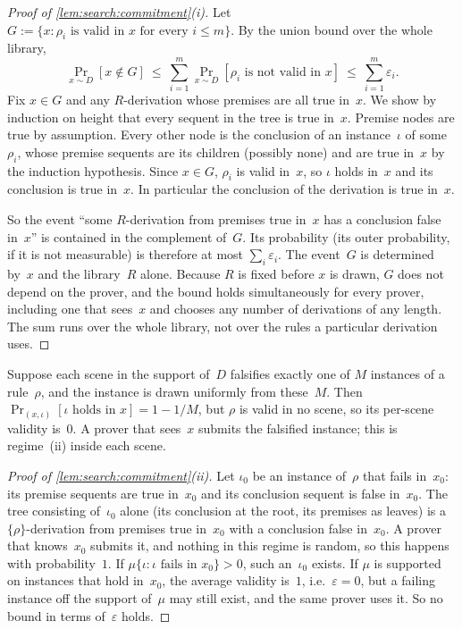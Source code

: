 \begin{proof}[Proof of \cref{lem:search:commitment}(i)]
Let $G:=\{x:\rho_i\text{ is valid in }x\text{ for every }i\le m\}$. By the union bound over the whole library,
\[
\Pr_{x\sim D}[x\notin G]\ \le\ \sum_{i=1}^m\Pr_{x\sim D}[\rho_i\text{ is not valid in }x]\ \le\ \sum_{i=1}^m\varepsilon_i .
\]
Fix $x\in G$ and any $R$-derivation whose premises are all true in~$x$. We show by induction on height that every sequent in the tree is true in~$x$. Premise nodes are true by assumption. Every other node is the conclusion of an instance~$\iota$ of some~$\rho_i$, whose premise sequents are its children (possibly none) and are true in~$x$ by the induction hypothesis. Since $x\in G$, $\rho_i$ is valid in~$x$, so $\iota$ holds in~$x$ and its conclusion is true in~$x$. In particular the conclusion of the derivation is true in~$x$.

So the event ``some $R$-derivation from premises true in~$x$ has a conclusion false in~$x$'' is contained in the complement of~$G$. Its probability (its outer probability, if it is not measurable) is therefore at most $\sum_i\varepsilon_i$. The event~$G$ is determined by~$x$ and the library~$R$ alone. Because $R$ is fixed before $x$ is drawn, $G$ does not depend on the prover, and the bound holds simultaneously for every prover, including one that sees~$x$ and chooses any number of derivations of any length. The sum runs over the whole library, not over the rules a particular derivation uses.
\end{proof}

\begin{remark}\label{rem:app:search:perpair}
Suppose each scene in the support of~$D$ falsifies exactly one of $M$ instances of a rule~$\rho$, and the instance is drawn uniformly from these~$M$. Then $\Pr_{(x,\iota)}[\iota\text{ holds in }x]=1-1/M$, but $\rho$ is valid in no scene, so its per-scene validity is~$0$. A prover that sees~$x$ submits the falsified instance; this is regime~(ii) inside each scene.
\end{remark}

\begin{proof}[Proof of \cref{lem:search:commitment}(ii)]
Let $\iota_0$ be an instance of~$\rho$ that fails in~$x_0$: its premise sequents are true in~$x_0$ and its conclusion sequent is false in~$x_0$. The tree consisting of~$\iota_0$ alone (its conclusion at the root, its premises as leaves) is a $\{\rho\}$-derivation from premises true in~$x_0$ with a conclusion false in~$x_0$. A prover that knows~$x_0$ submits it, and nothing in this regime is random, so this happens with probability~$1$. If $\mu\{\iota:\iota\text{ fails in }x_0\}>0$, such an~$\iota_0$ exists. If $\mu$ is supported on instances that hold in~$x_0$, the average validity is~$1$, i.e.\ $\varepsilon=0$, but a failing instance off the support of~$\mu$ may still exist, and the same prover uses it. So no bound in terms of~$\varepsilon$ holds.
\end{proof}

